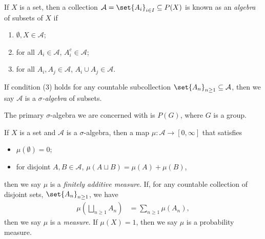 \documentclass[10pt]{mypackage}
\begin{document}
\begin{definition}
  If $X$ is a set, then a collection $\mathcal{A} = \set{A_i}_{i\in I}\subseteq P(X)$ is known as an \textit{algebra} of subsets of $X$ if
  \begin{enumerate}[(1)]
    \item $\emptyset,X\in \mathcal{A}$;
    \item for all $A_i\in \mathcal{A}$, $A_i^{c}\in \mathcal{A}$;
    \item for all $A_i,A_j\in \mathcal{A}$, $A_i\cup A_j\in \mathcal{A}$.
  \end{enumerate}
  If condition (3) holds for any countable subcollection $\set{A_n}_{n\geq 1}\subseteq \mathcal{A}$, then we say $\mathcal{A}$ is a \textit{$\sigma$-algebra} of subsets.\newline

  The primary $\sigma$-algebra we are concerned with is $P(G)$, where $G$ is a group.
\end{definition}
\begin{definition}[Measures]
  If $X$ is a set and $\mathcal{A}$ is a $\sigma$-algebra, then a map $\mu\colon \mathcal{A}\rightarrow [0,\infty]$ that satisfies
  \begin{itemize}
    \item $\mu\left( \emptyset \right) = 0$;
    \item for disjoint $A,B\in \mathcal{A}$, $\mu\left( A\sqcup B \right) = \mu\left( A \right) + \mu\left( B \right)$,
  \end{itemize}
  then we say $\mu$ is a \textit{finitely additive measure}. If, for any countable collection of disjoint sets, $\set{A_n}_{n\geq 1}$, we have
  \begin{align*}
    \mu\left( \bigsqcup_{n\geq 1}A_n \right) &= \sum_{n\geq 1}\mu\left( A_n \right),
  \end{align*}
  then we say $\mu$ is a \textit{measure}. If $\mu\left( X \right) = 1$, then we say $\mu$ is a probability measure.
\end{definition}
\end{document}

